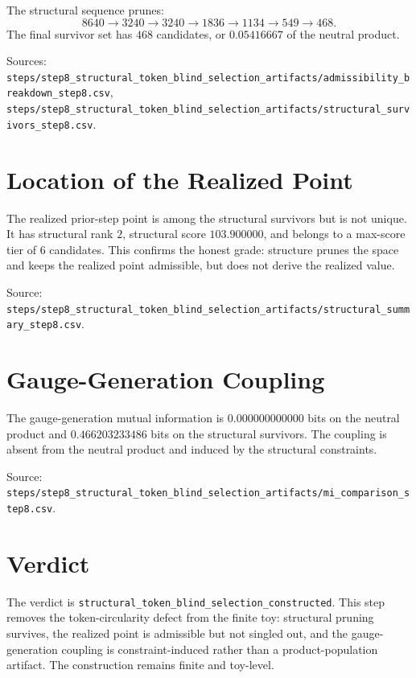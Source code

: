 \documentclass[11pt]{article}
\begin{document}
The structural sequence prunes:
\[
8640 \to 3240 \to 3240 \to 1836 \to 1134 \to 549 \to 468.
\]
The final survivor set has \(468\) candidates, or \(0.05416667\) of the neutral product.

Sources: \texttt{steps/step8\_structural\_token\_blind\_selection\_artifacts/admissibility\_breakdown\_step8.csv}, \texttt{steps/step8\_structural\_token\_blind\_selection\_artifacts/structural\_survivors\_step8.csv}.

\section{Location of the Realized Point}

The realized prior-step point is among the structural survivors but is not unique. It has structural rank \(2\), structural score \(103.900000\), and belongs to a max-score tier of \(6\) candidates. This confirms the honest grade: structure prunes the space and keeps the realized point admissible, but does not derive the realized value.

Source: \texttt{steps/step8\_structural\_token\_blind\_selection\_artifacts/structural\_summary\_step8.csv}.

\section{Gauge-Generation Coupling}

The gauge-generation mutual information is \(0.000000000000\) bits on the neutral product and \(0.466203233486\) bits on the structural survivors. The coupling is absent from the neutral product and induced by the structural constraints.

Source: \texttt{steps/step8\_structural\_token\_blind\_selection\_artifacts/mi\_comparison\_step8.csv}.

\section{Verdict}

The verdict is \texttt{structural\_token\_blind\_selection\_constructed}. This step removes the token-circularity defect from the finite toy: structural pruning survives, the realized point is admissible but not singled out, and the gauge-generation coupling is constraint-induced rather than a product-population artifact. The construction remains finite and toy-level.
\end{document}
